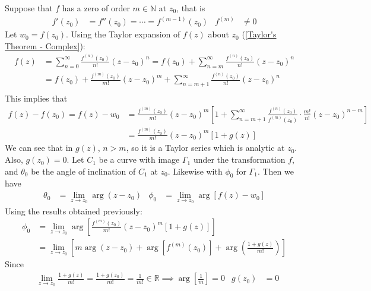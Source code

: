 \documentclass[12pt, english]{book}
\begin{document}
	\begin{example}
		\label{Zero of order m and critical point Example - Complex}
		{\color{Grey}
		Suppose that \(f\) has a zero of order \(m \in \mathbb{N}\) at \(z_0\), that is 
		\begin{align*}
			f'(z_0) &= f''(z_0) = \cdots = f^{(m-1)}(z_0)	&
				f^{(m)} &\neq 0
		\end{align*}
		Let \(w_0 = f(z_0)\). Using the Taylor expansion of \(f(z)\) about \(z_0\) (\cref{Taylor's Theorem - Complex}):
		\begin{align*}
			f(z) 
			&= \sum_{n=0}^{\infty} \frac{f^{(n)}(z_0)}{n!} (z - z_0)^n
			 = f(z_0) + \sum_{n=m}^{\infty} \frac{f^{(n)}(z_0)}{n!} (z - z_0)^n \\
			&= f(z_0) + \frac{f^{(m)}(z_0)}{m!}(z-z_0)^m + \sum_{n=m+1}^{\infty} \frac{f^{(n)}(z_0)}{n!} (z - z_0)^n \\
		\end{align*}
		This implies that 
		\begin{align*}
			f(z) - f(z_0) = f(z) - w_0
			&= \frac{f^{(m)}(z_0)}{m!} (z - z_0)^m \left[
				1 + \sum_{n=m+1}^{\infty} \frac{f^{(n)}(z_0)}{f^{(m)}(z_0)} \cdot \frac{m!}{n!} (z-z_0)^{n-m}
				\right]\\
			&= \frac{f^{(m)}(z_0)}{m!} (z - z_0)^m [1 + g(z)]
		\end{align*}
		We can see that in \(g(z)\), \(n > m\), so it is a Taylor series which is analytic at \(z_0\). Also, \(g(z_0) = 0\). Let \(C_1\) be a curve with image \(\Gamma_1\) under the transformation \(f\), and \(\theta_0\) be the angle of inclination of \(C_1\) at \(z_0\). Likewise with \(\phi_0\) for \(\Gamma_1\). Then we have 
		\begin{align*}
			\theta_0 &= \lim_{z \rightarrow z_0} \arg(z-z_0) &
			\phi_0 &= \lim_{z \rightarrow z_0} \arg[f(z) - w_0]
		\end{align*}
		Using the results obtained previously:
		\begin{align*}
			\phi_0 
			&= \lim_{z \rightarrow z_0} \arg 
				\left[\frac{f^{(m)}(z_0)}{m!} (z - z_0)^m [1 + g(z)] \right] \\
			&= \lim_{z \rightarrow z_0} \left[m \arg(z-z_0) + \arg [f^{(m)}(z_0)] + \arg\left(\frac{1 + g(z)}{m!}\right) \right]
		\end{align*}
		Since
		\begin{align*}
			&\lim_{z \rightarrow z_0}\frac{1 + g(z)}{m!} 
			 = \frac{1 + g(z_0)}{m!} = \frac{1}{m!} \in \mathbb{R}
			  \implies \arg\left[\frac{1}{m}\right] = 0&
				g(z_0) &= 0
		\end{align*}
}
\end{example}
\end{document}
